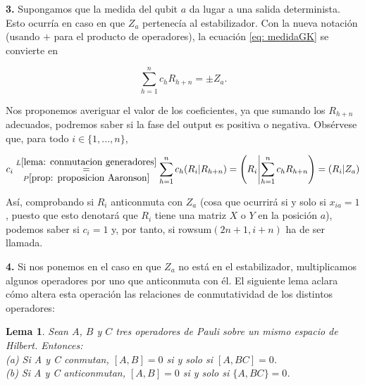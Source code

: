 \documentclass[11pt,a4paper,twoside,pdf]{article}
\numberwithin{equation}{section}
\newtheorem{lemma}{Lema}
\begin{document}
	\vspace{0.35cm}
	
	\noindent \textbf{3. }  Supongamos que la medida del qubit $a$ da lugar a una salida determinista. Esto ocurría en caso en que $Z_a$ pertenecía al estabilizador. Con la nueva notación (usando $+$ para el producto de operadores), la ecuación \eqref{eq: medidaGK} se convierte en 
	
		\begin{equation}\label{eq: medida Z}
			\displaystyle\sum_{h=1}^n c_h R_{h+n} = \pm Z_a .
		\end{equation}
	
	Nos proponemos averiguar el valor de los coeficientes, ya que sumando los $R_{h+n}$ adecuados, podremos saber si la fase del output es positiva o negativa. Obsérvese que, para todo $i \in \{1,...,n\}$,
	
		\begin{equation}
			c_i \underset{P\ref{prop: proposicion Aaronson}}{\overset{L\ref{lema: conmutacion generadores}}{=}}
			\displaystyle\sum_{h=1}^n c_h ( R_i | R_{h+n} ) =
			\left( R_i \, \vline \displaystyle\sum_{h=1}^n c_h R_{h+n} \right) = (R_i|Z_a)
		\end{equation}
	
	Así, comprobando si $R_i$ anticonmuta con $Z_a$ (cosa que ocurrirá si y solo si $x_{ia}=1$, puesto que esto denotará que $R_i$ tiene una matriz $X$ o $Y$ en la posición $a$), podemos saber si $c_i=1$ y, por tanto, si rowsum$(2n+1,i+n)$ ha de ser llamada.
		
	\vspace{0.35cm}
	
	\noindent \textbf{4. }  Si nos ponemos en el caso en que $Z_a$ no está en el estabilizador, multiplicamos algunos operadores por uno que anticonmuta con él. El siguiente lema aclara cómo altera esta operación las relaciones de conmutatividad de los distintos operadores:
	
		\begin{lemma} \label{lema: conmutacion producto}
			Sean $A$, $B$ y $C$ tres operadores de Pauli sobre un mismo espacio de Hilbert. Entonces: \\
				\indent (a) Si A y C conmutan, $[A,B]=0$ si y solo si $[A,BC]=0$. \\
				\indent (b) Si A y C anticonmutan, $[A,B]=0$ si y solo si $\{A,BC\}=0$.
		\end{lemma}	
	
\end{document}
